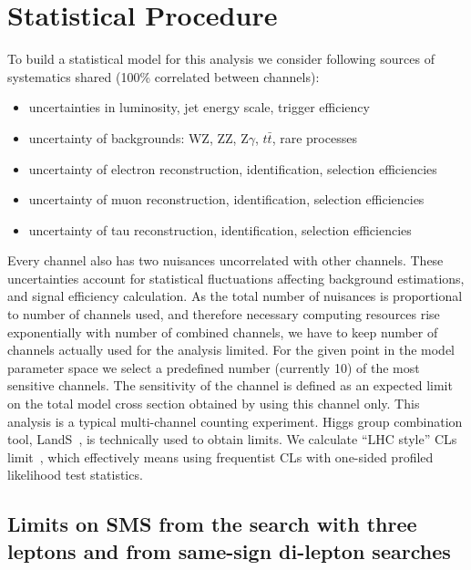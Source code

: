 \newpage
\section{Statistical Procedure}
To build a statistical model for this analysis we consider following sources of systematics
shared (100\% correlated between channels):
\begin{itemize}
\item uncertainties in luminosity, jet energy scale, trigger efficiency
\item uncertainty of backgrounds: WZ, ZZ, Z$\gamma$, $t\bar{t}$, rare processes
\item uncertainty of electron reconstruction, identification, selection efficiencies
\item uncertainty of muon reconstruction, identification, selection efficiencies
\item uncertainty of tau reconstruction, identification, selection efficiencies
\end{itemize}
Every channel also has two nuisances uncorrelated with other channels.
These uncertainties account for statistical fluctuations affecting
background estimations, and signal efficiency calculation.
As the total number of nuisances is proportional to number of channels used,
and therefore necessary computing resources rise exponentially with number
of combined channels,
we have to keep number of channels actually used for the analysis limited.
For the given point in the model parameter space we select a predefined
number (currently 10) of the most sensitive
channels. The sensitivity of the channel is defined as an expected limit
on the total model cross section obtained by using this channel only.
This analysis is a typical multi-channel counting experiment. Higgs group combination
tool, LandS~\cite{lands}, is technically used to obtain limits.
We calculate ``LHC style'' CLs limit~\cite{higgsCombination},
which effectively means using frequentist CLs with one-sided profiled likelihood
test statistics.


\subsection{Limits on SMS from the search with three leptons and from same-sign di-lepton searches}
\label{tri-ss-combine}

